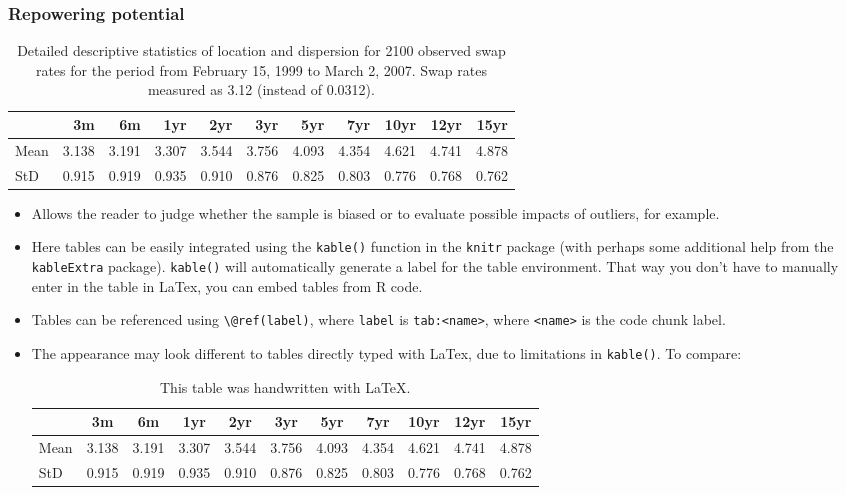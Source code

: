 \documentclass[a4paper,11pt]{article}
\begin{document}
\hypertarget{repowering-potential}{%
\subsubsection{Repowering potential}\label{repowering-potential}}
\begin{table}[H]

\caption{\label{tab:table1}Detailed descriptive statistics of location and dispersion for 2100 observed swap rates for the period from February 15, 1999 to March 2, 2007. Swap rates measured as 3.12 (instead of 0.0312).}
\centering
\begin{tabular}[t]{lrrrrrrrrrr}
\toprule
  & 3m & 6m & 1yr & 2yr & 3yr & 5yr & 7yr & 10yr & 12yr & 15yr\\
\midrule
Mean & 3.138 & 3.191 & 3.307 & 3.544 & 3.756 & 4.093 & 4.354 & 4.621 & 4.741 & 4.878\\
StD & 0.915 & 0.919 & 0.935 & 0.910 & 0.876 & 0.825 & 0.803 & 0.776 & 0.768 & 0.762\\
\midrule
\bottomrule
\end{tabular}
\end{table}
\begin{itemize}
\item
  Allows the reader to judge whether the sample is biased or to evaluate
  possible impacts of outliers, for example.
\item
  Here tables can be easily integrated using the \texttt{kable()} function in the
  \texttt{knitr} package (with perhaps some additional help from the \texttt{kableExtra}
  package). \texttt{kable()} will automatically generate a label for the table
  environment. That way you don't have to manually enter in the table in LaTex,
  you can embed tables from R code.
\item
  Tables can be referenced using \texttt{\textbackslash{}@ref(label)}, where \texttt{label} is \texttt{tab:\textless{}name\textgreater{}},
  where \texttt{\textless{}name\textgreater{}} is the code chunk label.
\item
  The appearance may look different to tables directly typed with LaTex, due to
  limitations in \texttt{kable()}. To compare:
  \begin{table}[ht]
    \begin{center}
        {\footnotesize
        \begin{tabular}{l|cccccccccc}
            \hline \hline
                      & 3m    & 6m    & 1yr   & 2yr   & 3yr   & 5yr   & 7yr   & 10yr  & 12yr  & 15yr   \\
            \hline
                Mean   & 3.138 & 3.191 & 3.307 & 3.544 & 3.756 & 4.093 & 4.354 & 4.621 & 4.741 & 4.878  \\
                StD    & 0.915 & 0.919 & 0.935 & 0.910 & 0.876 & 0.825 & 0.803 & 0.776 & 0.768 & 0.762  \\
            \hline \hline
        \end{tabular}}
    \end{center}
    \caption{This table was handwritten with LaTeX.}
    \label{tab:table2}
    \end{table}
\end{itemize}
\end{document}
